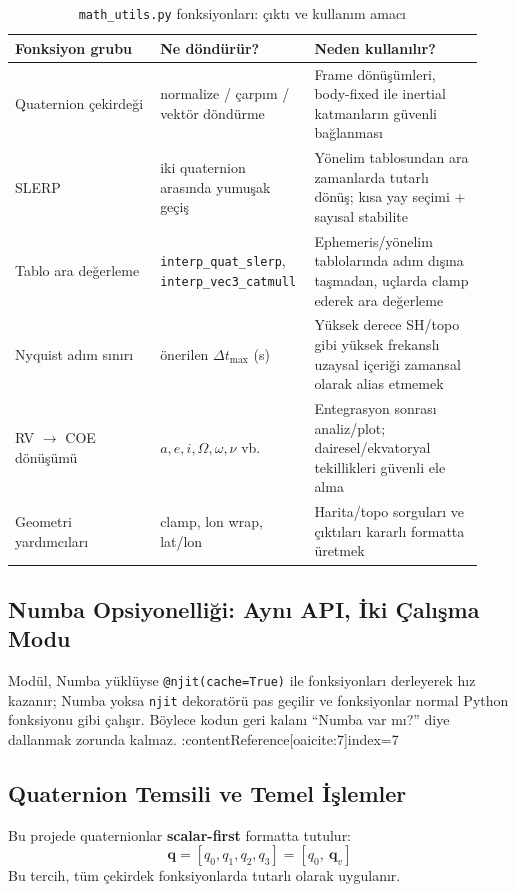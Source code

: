 \begin{table}[H]
\centering
\caption{\texttt{math\_utils.py} fonksiyonları: çıktı ve kullanım amacı}
\label{tab:mathutils_map}
\begin{tabular}{p{0.30\linewidth} p{0.28\linewidth} p{0.35\linewidth}}
\hline
\textbf{Fonksiyon grubu} & \textbf{Ne döndürür?} & \textbf{Neden kullanılır?} \\
\hline
Quaternion çekirdeği & normalize / çarpım / vektör döndürme & Frame dönüşümleri, body-fixed ile inertial katmanların güvenli bağlanması \\
SLERP & iki quaternion arasında yumuşak geçiş & Yönelim tablosundan ara zamanlarda tutarlı dönüş; kısa yay seçimi + sayısal stabilite  \\
Tablo ara değerleme & \texttt{interp\_quat\_slerp}, \texttt{interp\_vec3\_catmull} & Ephemeris/yönelim tablolarında adım dışına taşmadan, uçlarda clamp ederek ara değerleme \\
Nyquist adım sınırı & önerilen \(\Delta t_{\max}\) (s) & Yüksek derece SH/topo gibi yüksek frekanslı uzaysal içeriği zamansal olarak alias etmemek \\
RV \(\rightarrow\) COE dönüşümü & \(a,e,i,\Omega,\omega,\nu\) vb. & Entegrasyon sonrası analiz/plot; dairesel/ekvatoryal tekillikleri güvenli ele alma  \\
Geometri yardımcıları & clamp, lon wrap, lat/lon & Harita/topo sorguları ve çıktıları kararlı formatta üretmek  \\
\hline
\end{tabular}
\end{table}

\subsection*{Numba Opsiyonelliği: Aynı API, İki Çalışma Modu}
Modül, Numba yüklüyse \texttt{@njit(cache=True)} ile fonksiyonları derleyerek hız kazanır; Numba yoksa \texttt{njit} dekoratörü pas geçilir ve fonksiyonlar normal Python fonksiyonu gibi çalışır. Böylece kodun geri kalanı ``Numba var mı?'' diye dallanmak zorunda kalmaz. :contentReference[oaicite:7]{index=7}

\subsection*{Quaternion Temsili ve Temel İşlemler}
Bu projede quaternionlar \textbf{scalar-first} formatta tutulur:
\[
\mathbf{q}=[q_0,q_1,q_2,q_3] = [q_0,\ \mathbf{q}_v]
\]
Bu tercih, tüm çekirdek fonksiyonlarda tutarlı olarak uygulanır. 

